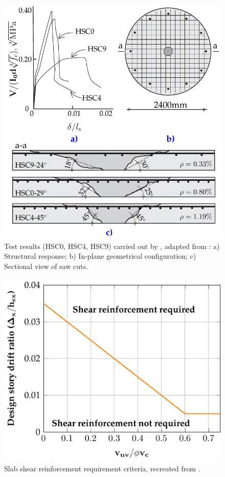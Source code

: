 \documentclass[twocolumn]{article} %
\begin{document}
\begin{figure}\centering
\includegraphics[width=\columnwidth]{Figures/tikzout/b16if3.pdf}\caption{Test results (HSC0, HSC4, HSC9) carried out by \cite{hallgren1996punching},  adapted from \cite{bompa2016b}: a) Structural response; b) In-plane geometrical configuration; c) Sectional view of saw cuts.}\label{b16if3}
\end{figure}
\begin{figure}\centering
    \includegraphics[width=\columnwidth]{Figures/tikzout/fr181451.pdf}\caption{Slab shear reinforcement requirement criteria, recreated from \cite{aci31819}.}\label{fr181451}
    \end{figure}
\end{document}
